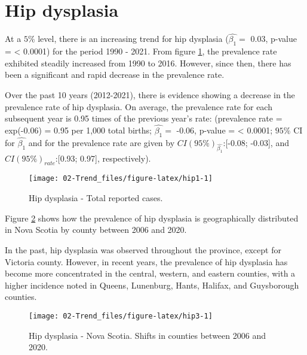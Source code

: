 \documentclass[
]{krantz}
\begin{document}
\hypertarget{section310}{%
\section{Hip dysplasia}\label{section310}}

At a \(5\%\) level, there is an increasing trend for hip dysplasia (\(\hat{\beta_{1}} =\) 0.03, p-value = \textless{} 0.0001) for the period 1990 - 2021. From figure \ref{fig:hip1}, the prevalence rate exhibited steadily increased from 1990 to 2016. However, since then, there has been a significant and rapid decrease in the prevalence rate.

Over the past 10 years (2012-2021), there is evidence showing a decrease in the prevalence rate of hip dysplasia. On average, the prevalence rate for each subsequent year is 0.95 times of the previous year's rate: (prevalence rate = exp(-0.06) = 0.95 per 1,000 total births; \(\hat{\beta_{1}} =\) -0.06, p-value = \textless{} 0.0001; \(95\%\) CI for \(\hat{\beta_{1}}\) and for the prevalence rate are given by \(CI(95\%)_{\hat{\beta_{1}}}\):{[}-0.08; -0.03{]}, and \(CI(95\%)_{rate}\):{[}0.93; 0.97{]}, respectively).

\begin{figure}[h]

{\centering \texttt{[image: 02-Trend\_files/figure-latex/hip1-1]} 

}

\caption{Hip dysplasia - Total reported cases.}\label{fig:hip1}
\end{figure}

Figure \ref{fig:hip3} shows how the prevalence of hip dysplasia is geographically distributed in Nova Scotia by county between 2006 and 2020.

In the past, hip dysplasia was observed throughout the province, except for Victoria county. However, in recent years, the prevalence of hip dysplasia has become more concentrated in the central, western, and eastern counties, with a higher incidence noted in Queens, Lunenburg, Hants, Halifax, and Guysborough counties.

\begin{figure}[h]

{\centering \texttt{[image: 02-Trend\_files/figure-latex/hip3-1]} 

}

\caption{Hip dysplasia - Nova Scotia. Shifts in counties between 2006 and 2020.}\label{fig:hip3}
\end{figure}
\end{document}
